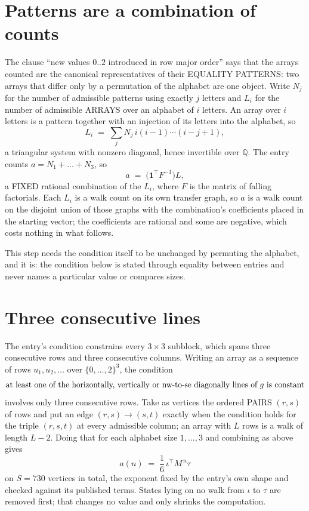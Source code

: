 \documentclass[11pt,a4paper]{article}
\theoremstyle{plain}
\theoremstyle{definition}
\begin{document}
\section{Patterns are a combination of counts}

The clause ``new values $0..2$ introduced in row major order'' says that the arrays
counted are the canonical representatives of their EQUALITY PATTERNS: two arrays that differ
only by a permutation of the alphabet are one object. Write $N_j$ for the number of admissible
patterns using exactly $j$ letters and $L_i$ for the number of admissible ARRAYS over an
alphabet of $i$ letters. An array over $i$ letters is a pattern together with an injection of
its letters into the alphabet, so
\[
L_i\;=\;\sum_{j}N_j\,i(i-1)\cdots(i-j+1),
\]
a triangular system with nonzero diagonal, hence invertible over $\mathbb{Q}$. The entry
counts $a=N_1+\dots+N_{3}$, so
\[
a\;=\;\bigl(\mathbf{1}^{\!\top}F^{-1}\bigr)L ,
\]
a FIXED rational combination of the $L_i$, where $F$ is the matrix of falling factorials.
Each $L_i$ is a walk count on its own transfer graph, so $a$ is a walk count on the disjoint
union of those graphs with the combination's coefficients placed in the starting vector; the
coefficients are rational and some are negative, which costs nothing in what follows.

This step needs the condition itself to be unchanged by permuting the alphabet, and it is:
the condition below is stated through equality between entries and never names a particular
value or compares sizes.

\section{Three consecutive lines}

The entry's condition constrains every $3\times3$ subblock, which spans three consecutive
rows and three consecutive columns. Writing an array as a sequence of rows
$u_1,u_2,\dots$ over $\{0,\dots,2\}^{3}$, the condition
\[
\text{at least one}\text{ of the horizontally, vertically or nw-to-se diagonally lines of }g\text{ \text{is constant}}
\]
involves only three consecutive rows. Take as vertices the ordered PAIRS $(r,s)$ of
rows and put an edge $(r,s)\to(s,t)$ exactly when the condition holds for the triple
$(r,s,t)$ at every admissible column; an array with $L$ rows is a walk of length $L-2$.
Doing that for each alphabet size $1,\dots,3$ and combining as above gives
\[
a(n)\;=\;\frac{1}{6}\,\iota^{\!\top}M^{\,n}\tau
\]
on $S=730$ vertices in total, the exponent fixed by the entry's own shape and checked against
its published terms. States lying on no walk from $\iota$ to $\tau$ are removed first; that
changes no value and only shrinks the computation.
\end{document}

